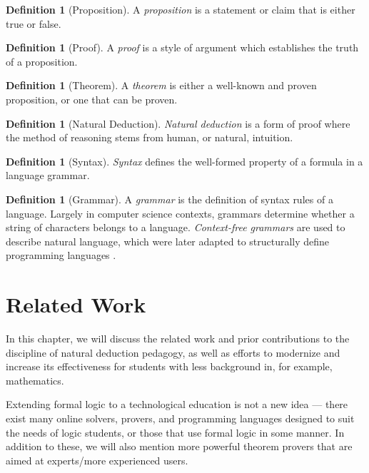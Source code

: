 \documentclass[ms]{uncgdissertationexp2}
\theoremstyle{plain}
\theoremstyle{definition}
\newtheorem{definition}[theorem]{Definition}
\theoremstyle{remark}
\begin{document}
\begin{definition}[Proposition]
	A \textit{proposition} is a statement or claim that is either true or false.
\end{definition}

\begin{definition}[Proof]
	A \textit{proof} is a style of argument which establishes the truth of a proposition.
\end{definition}
    
\begin{definition}[Theorem]
	A \textit{theorem} is either a well-known and proven proposition, or one that can be proven.
\end{definition}

\begin{definition}[Natural Deduction]
	\textit{Natural deduction} \cite{gentzen} is a form of proof where the method of reasoning stems from human, or natural, intuition.
\end{definition}

\begin{definition}[Syntax]
	\textit{Syntax} defines the well-formed property of a formula in a language grammar.
\end{definition}

\begin{definition}[Grammar]
	A \textit{grammar} is the definition of syntax rules of a language. Largely in computer science contexts, grammars determine whether a string of characters belongs to a language. \textit{Context-free grammars} are used to describe natural language, which were later adapted to structurally define programming languages \cite{dragonbook}.
\end{definition}

\chapter{Related Work}\label{chapter:2}
In this chapter, we will discuss the related work and prior contributions to the discipline of natural deduction pedagogy, as well as efforts to modernize and increase its effectiveness for students with less background in, for example, mathematics. 

Extending formal logic to a technological education is not a new idea --- there exist many online solvers, provers, and programming languages designed to suit the needs of logic students, or those that use formal logic in some manner. In addition to these, we will also mention more powerful theorem provers that are aimed at experts/more experienced users.
\end{document}
